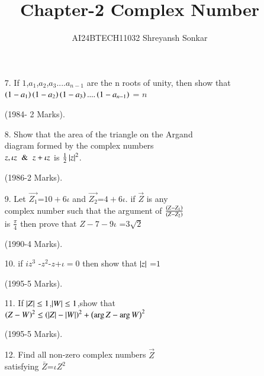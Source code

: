 \documentclass[journal,12pt,twocolumn]{IEEEtran}
\theoremstyle{remark}
\begin{document}

\vspace{3cm}

\title{Chapter-2 Complex Number}
\author{AI24BTECH11032 Shreyansh Sonkar
}
\maketitle
\newpage
\bigskip

\renewcommand{\thefigure}{\theenumi}
\renewcommand{\thetable}{\theenumi}
\begin{enumerate}




\item[7.] If $1$,$a_1$,$a_2$,$a_3$....$a_{n-1}$
 are the n roots of unity, then show that $\left(1-a_1\right)\left(1-a_2\right)\left(1-a_3\right)....\left(1-a_{n-1}\right)$ = $n$  
 
  \hfill (1984- 2 Marks).\\



\item[8.]  Show that the area of the 
  triangle on the Argand\\ 
  diagram formed by the complex 
  numbers\\
  $z, \iota z \And z+ \iota z$ 
  is $\frac{1}{2}\left\vert z\right\vert^2$.

  \hfill (1986-2 Marks).\\

\item[9.] Let $\vec{Z_1}$=$10+6\iota$ and $\vec{Z_2}$=$4+6\iota$. if $\vec{Z}$ is any \\
complex number such that the argument of ${\frac{\left(Z-Z_1\right)}{\left(Z-Z_2
\right)}}$\\
is  ${\frac{\pi}{4}}$ then prove that $Z-7-9\iota$ =$3\sqrt{2}$

 \hfill(1990-4 Marks).\\


\item[10.] if {$iz^{3}$ -$z^2$-$z$+$\iota=0$} then show that $\left\vert z\right\vert$ =$1$

\hfill(1995-5 Marks).\\

\item[11.] If $\left\vert Z\right\vert\le1$,$\left\vert W\right\vert\le1$,show that\\
$\left(Z-W\right)^2\le\left(\left\vert Z\right\vert-\left\vert W\right\vert\right)^2+\left(\arg Z-\arg W\right)^2$ 

\hfill(1995-5 Marks). \\


\item[12.] Find all non-zero complex numbers $\vec{Z}$ \\
satisfying $\bar Z$=$\iota Z^2 $ 


\end{enumerate}
\end{document}
